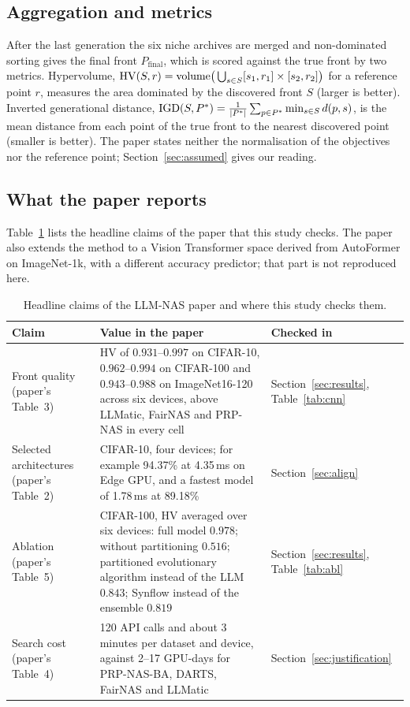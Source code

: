 \subsection{Aggregation and metrics}
After the last generation the six niche archives are merged and non-dominated sorting gives the final front $P_{\mathrm{final}}$, which is scored against the true front by two metrics. Hypervolume, $\mathrm{HV}(S,r)=\mathrm{volume}\big(\bigcup_{s\in S}[s_1,r_1]\times[s_2,r_2]\big)$ for a reference point $r$, measures the area dominated by the discovered front $S$ (larger is better). Inverted generational distance, $\mathrm{IGD}(S,P^\ast)=\frac{1}{|P^\ast|}\sum_{p\in P^\ast}\min_{s\in S}d(p,s)$, is the mean distance from each point of the true front to the nearest discovered point (smaller is better). The paper states neither the normalisation of the objectives nor the reference point; Section~\ref{sec:assumed} gives our reading.

\subsection{What the paper reports}
Table~\ref{tab:claims} lists the headline claims of the paper that this study checks. The paper also extends the method to a Vision Transformer space derived from AutoFormer on ImageNet-1k, with a different accuracy predictor; that part is not reproduced here.

\begin{table}[h]\centering\small
\caption{Headline claims of the LLM-NAS paper and where this study checks them.}\label{tab:claims}
\begin{tabular}{p{3.4cm}p{8.2cm}p{3.0cm}}
\toprule
Claim & Value in the paper & Checked in \\
\midrule
Front quality (paper's Table~3) & HV of $0.931$--$0.997$ on CIFAR-10, $0.962$--$0.994$ on CIFAR-100 and $0.943$--$0.988$ on ImageNet16-120 across six devices, above LLMatic, FairNAS and PRP-NAS in every cell & Section~\ref{sec:results}, Table~\ref{tab:cnn} \\
Selected architectures (paper's Table~2) & CIFAR-10, four devices; for example 94.37\% at 4.35\,ms on Edge GPU, and a fastest model of 1.78\,ms at 89.18\% & Section~\ref{sec:align} \\
Ablation (paper's Table~5) & CIFAR-100, HV averaged over six devices: full model $0.978$; without partitioning $0.516$; partitioned evolutionary algorithm instead of the LLM $0.843$; Synflow instead of the ensemble $0.819$ & Section~\ref{sec:results}, Table~\ref{tab:abl} \\
Search cost (paper's Table~4) & 120 API calls and about 3 minutes per dataset and device, against 2--17 GPU-days for PRP-NAS-BA, DARTS, FairNAS and LLMatic & Section~\ref{sec:justification} \\
\bottomrule
\end{tabular}
\end{table}

